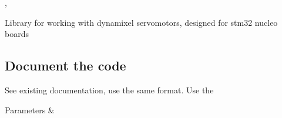 ,

Library for working with dynamixel servomotors, designed for stm32 nucleo boards

\subsection*{Document the code}

See existing documentation, use the same format. Use the 
\begin{DoxyParams}{Parameters}
{\em } & \\
\hline
\end{DoxyParams}
